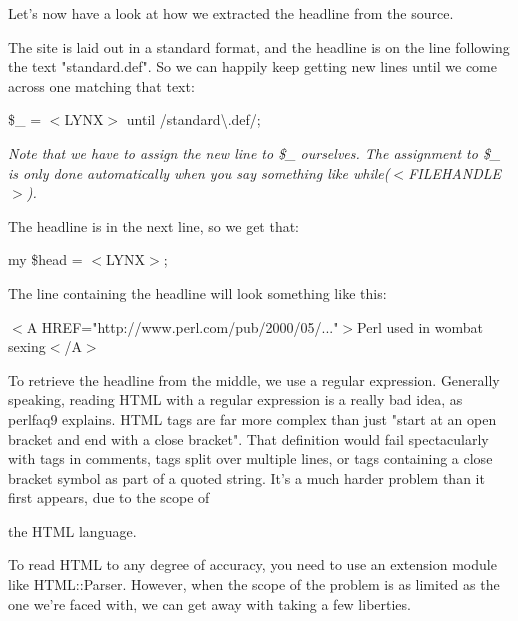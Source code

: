 \documentclass[a4paper,11pt]{book}
\begin{document}
\noindent 

\noindent Let's now have a look at how we extracted the headline from the source.

\noindent 

\noindent The site is laid out in a standard format, and the headline is on the line following the text "standard.def". So we can happily keep getting new lines until we come across one matching that text:

\noindent 

\noindent \$\_  = $<$LYNX$>$ until /standard\textbackslash .def/;

\noindent 

\noindent \textit{Note that we have to assign the new line to \$\_ ourselves. The assignment to \$\_ is only done automatically when you say something like while($<$FILEHANDLE$>$).}

\noindent 

\noindent The headline is in the next line, so we get that:

\noindent 

\noindent my \$head = $<$LYNX$>$;

\noindent 

\noindent The line containing the headline will look something like this:

\noindent 

\noindent $<$A HREF="http://www.perl.com/pub/2000/05/..."$>$Perl used in wombat sexing$<$/A$>$

\noindent 

\noindent To retrieve the headline from the middle, we use a regular expression. Generally speaking, reading HTML with a regular expression is a really bad idea, as perlfaq9 explains. HTML tags are far more complex than just "start at an open bracket and end with a close bracket". That definition would fail spectacularly with tags in comments, tags split over multiple lines, or tags containing a close bracket symbol as part of a quoted string. It's a much harder problem than it first appears, due to the scope of

\noindent the HTML language.

\noindent 

\noindent To read HTML to any degree of accuracy, you need to use an extension module like HTML::Parser. However, when the scope of the problem is as limited as the one we're faced with, we can get away with taking a few liberties.

\noindent 
\end{document}
